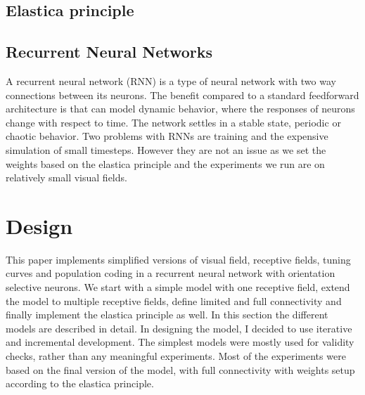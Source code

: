 
\section{Elastica principle}






\section{Recurrent Neural Networks}

A recurrent neural network (RNN) is a type of neural network with two way connections between its neurons. The benefit compared to a standard feedforward architecture is that can model dynamic behavior, where the responses of neurons change with respect to time. The network settles in a stable state, periodic or chaotic behavior. Two problems with RNNs are training and the expensive simulation of small timesteps. However they are not an issue as we set the weights based on the elastica principle and the experiments we run are on relatively small visual fields.

\chapter{Design}

This paper implements simplified versions of visual field, receptive fields, tuning curves and population coding in a recurrent neural network with orientation selective neurons. We start with a simple model with one receptive field, extend the model to multiple receptive fields, define limited and full connectivity and finally implement the elastica principle as well. In this section the different models are described in detail. In designing the model, I decided to use iterative and incremental development. The simplest models were mostly used for validity checks, rather than any meaningful experiments. Most of the experiments were based on the final version of the model, with full connectivity with weights setup according to the elastica principle.  

